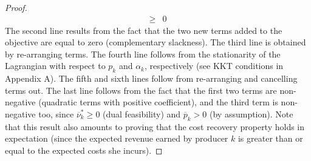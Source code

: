 \documentclass{article}
\begin{document}
\begin{proof}
\begin{align*}
    \ge& 0
\end{align*}
The second line results from the fact that the two new terms added to the objective are equal to zero (complementary slackness). The third line is obtained by re-arranging terms. The fourth line follows from the stationarity of the Lagrangian with respect to $p_k$ and $\alpha_k$, respectively (see KKT conditions in Appendix A). The fifth and sixth lines follow from re-arranging and cancelling terms out. The last line follows from the fact that the first two terms are non-negative (quadratic terms with positive coefficient), and the third term is non-negative too, since $\overline{\nu}_k^* \ge 0$ (dual feasibility) and $\overline{p}_k > 0$ (by assumption). Note that this result also amounts to proving that the cost recovery property holds in expectation (since the expected revenue earned by producer $k$ is greater than or equal to the expected costs she incurs).


\end{proof}
\end{document}

